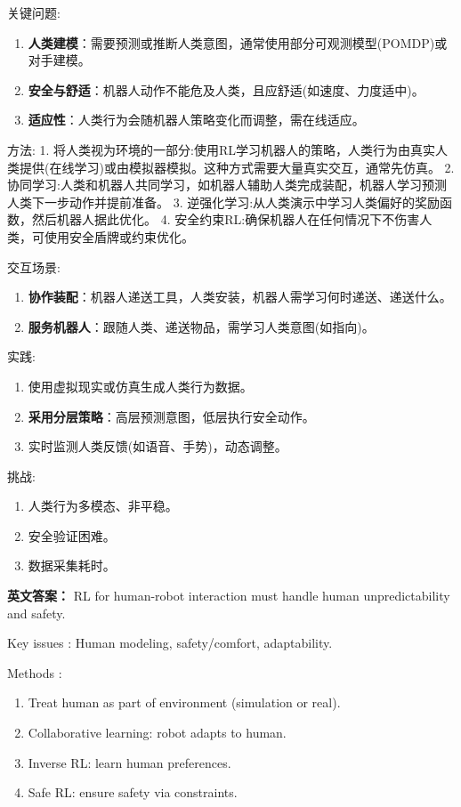 \documentclass[10pt,a4paper]{ctexart}
\begin{document}
 关键问题:
\begin{enumerate}
    \item \textbf{人类建模}：需要预测或推断人类意图，通常使用部分可观测模型(POMDP)或对手建模。
    \item \textbf{安全与舒适}：机器人动作不能危及人类，且应舒适(如速度、力度适中)。
    \item \textbf{适应性}：人类行为会随机器人策略变化而调整，需在线适应。
\end{enumerate}

 方法:
1.  将人类视为环境的一部分:使用RL学习机器人的策略，人类行为由真实人类提供(在线学习)或由模拟器模拟。这种方式需要大量真实交互，通常先仿真。
2.  协同学习:人类和机器人共同学习，如机器人辅助人类完成装配，机器人学习预测人类下一步动作并提前准备。
3.  逆强化学习:从人类演示中学习人类偏好的奖励函数，然后机器人据此优化。
4.  安全约束RL:确保机器人在任何情况下不伤害人类，可使用安全盾牌或约束优化。

 交互场景:
\begin{enumerate}
    \item \textbf{协作装配}：机器人递送工具，人类安装，机器人需学习何时递送、递送什么。
    \item \textbf{服务机器人}：跟随人类、递送物品，需学习人类意图(如指向)。
\end{enumerate}

 实践:
\begin{enumerate}
    \item 使用虚拟现实或仿真生成人类行为数据。
    \item \textbf{采用分层策略}：高层预测意图，低层执行安全动作。
    \item 实时监测人类反馈(如语音、手势)，动态调整。
\end{enumerate}

 挑战:
\begin{enumerate}
    \item 人类行为多模态、非平稳。
    \item 安全验证困难。
    \item 数据采集耗时。
\end{enumerate}

\textbf{英文答案：}  
RL for human-robot interaction must handle human unpredictability and safety.

 Key issues : Human modeling, safety/comfort, adaptability.

 Methods :
\begin{enumerate}
    \item Treat human as part of environment (simulation or real).
    \item Collaborative learning: robot adapts to human.
    \item Inverse RL: learn human preferences.
    \item Safe RL: ensure safety via constraints.
\end{enumerate}
\end{document}
